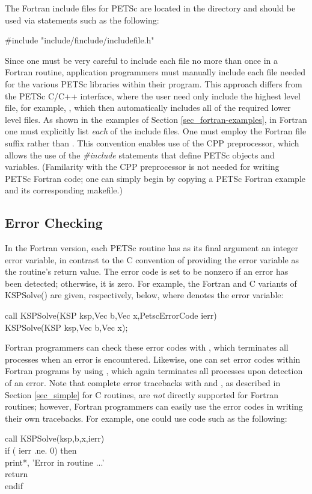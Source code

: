 The Fortran include files for PETSc are located in the directory 
 and should be used via statements 
such as the following:
\begin{tabbing}
    \#include "include/finclude/includefile.h"
\end{tabbing}
Since one must be very careful to include each file no more than once
in a Fortran routine, application programmers must manually include
each file needed for the various PETSc libraries within their
program.  This approach differs from the PETSc C/C++ interface, where
the user need only include the highest level file, for example, , which then automatically includes all of the required lower
level files.  As shown in the examples of Section
\ref{sec_fortran-examples}, in Fortran one must explicitly list {\em
each} of the include files. One must employ
the Fortran file suffix 
rather than .  This convention enables use of the CPP
preprocessor, which allows the use of the {\em \#include} statements
that define PETSc objects and variables. (Familarity with the CPP
preprocessor is not needed for writing PETSc Fortran code; one can simply
begin by copying a PETSc Fortran example and its corresponding
makefile.)  


\subsection{Error Checking}
\label{sec_fortran_errors}

In the Fortran version, each PETSc routine has as its final argument
an integer error variable, in contrast to the C convention of
providing the error variable as the routine's return value.  The error
code is set to be nonzero if an error has been detected; otherwise, it
is zero.  For example, the Fortran and C variants of KSPSolve() are
given, respectively, below, where  denotes the error variable:
\begin{tabbing}
   call KSPSolve(KSP ksp,Vec b,Vec x,PetscErrorCode ierr)\\
  KSPSolve(KSP ksp,Vec b,Vec x);
\end{tabbing}

Fortran programmers
can check these error codes with
, which terminates all processes when an error is
encountered.  Likewise, one can set error codes within Fortran programs by
using , which again terminates all processes
upon detection of an error.  
Note that complete error tracebacks with
 and , as described in Section
\ref{sec_simple} for C routines, are {\em not} directly supported for
Fortran routines; however, Fortran programmers can easily use the
error codes in writing their own tracebacks.  For example, one could
use code such as the following:
\begin{tabbing}
   call KSPSolve(ksp,b,x,ierr)\\
   if ( ierr .ne. 0) then\\
       print*, 'Error in routine ...'\\
       return\\
   endif
\end{tabbing}

